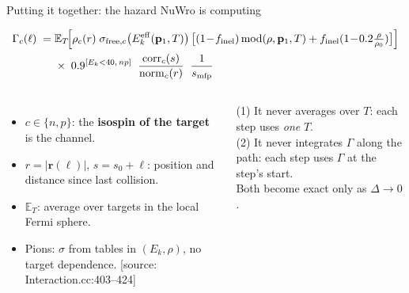 \documentclass[10pt,aspectratio=169]{beamer}
\newcommand{\G}{\Gamma}
\newcommand{\Ekeff}{E_k^{\rm eff}}
\newcommand{\tagsrc}[1]{{\scriptsize\color{aBlue}[source: #1]}}
\begin{document}
\begin{frame}{Putting it together: the hazard NuWro is computing}
\begin{tcolorbox}[colback=aBlue!5,colframe=aBlue,boxrule=0.8pt]
\begin{align*}
\G_c(\ell)\;=\;&\mathbb E_T\!\Big[\rho_c(r)\;\sigma_{{\rm free},c}\big(\Ekeff(\mathbf p_1,T)\big)\,
\big[(1\!-\!f_{\rm inel})\,\mathrm{mod}(\rho,\mathbf p_1,T)+f_{\rm inel}(1\!-\!0.2\tfrac{\rho}{\rho_0})\big]\Big]\\
&\times\;0.9^{[E_k<40,\,np]}\;\;
\frac{\mathrm{corr}_c(s)}{\mathrm{norm}_c(r)}\;\;\frac{1}{s_{\rm mfp}}
\end{align*}
\end{tcolorbox}
\begin{columns}[T]
\begin{itemize}\small
\item $c\in\{n,p\}$: the \textbf{isospin of the target} is the channel.
\item $r=|\mathbf r(\ell)|$, $s=s_0+\ell$: position and distance since last collision.
\item $\mathbb E_T$: average over targets in the local Fermi sphere.
\item Pions: $\sigma$ from tables in $(E_k,\rho)$, no target dependence. \tagsrc{Interaction.cc:403--424}
\end{itemize}
\begin{warnbox}
(1) It never averages over $T$: each step uses \emph{one} $T$.\\
(2) It never integrates $\G$ along the path: each step uses $\G$ at the step's start.\\[2pt]
Both become exact only as $\Delta\to0$.
\end{warnbox}
\end{columns}
\end{frame}
\end{document}
